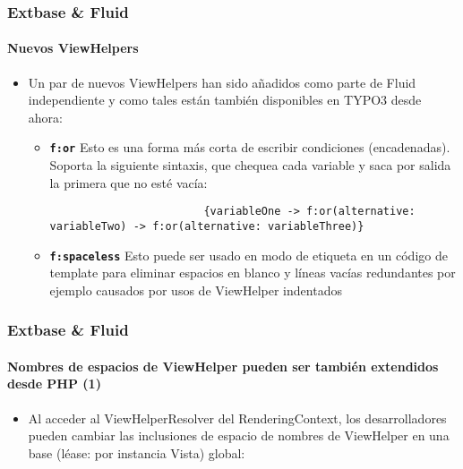 \begin{frame}[fragile]
	\frametitle{Extbase \& Fluid}
	\framesubtitle{Nuevos ViewHelpers}

	\lstset{basicstyle=\tiny\ttfamily}

	\begin{itemize}
		\item Un par de nuevos ViewHelpers han sido añadidos como parte de Fluid independiente
			y como tales están también disponibles en TYPO3 desde ahora:

			\begin{itemize}

				\item \textbf{\texttt{f:or}}\newline
					Esto es una forma más corta de escribir condiciones (encadenadas).
					Soporta la siguiente sintaxis, que chequea cada variable
					y saca por salida la primera que no esté vacía:

					\begin{lstlisting}
						{variableOne -> f:or(alternative: variableTwo) -> f:or(alternative: variableThree)}
					\end{lstlisting}

				\item \textbf{\texttt{f:spaceless}}\newline
					Esto puede ser usado en modo de etiqueta en un código de template para
					eliminar espacios en blanco y líneas vacías redundantes por ejemplo
					causados por usos de ViewHelper indentados

			\end{itemize}

	\end{itemize}

\end{frame}


\begin{frame}[fragile]
	\frametitle{Extbase \& Fluid}
	\framesubtitle{Nombres de espacios de ViewHelper pueden ser también extendidos desde PHP (1)}

	\begin{itemize}

		\item Al acceder al ViewHelperResolver del RenderingContext,
			los desarrolladores pueden cambiar las inclusiones de espacio de nombres de ViewHelper en una base (léase: por instancia Vista) global:

	\end{itemize}

\end{frame}

